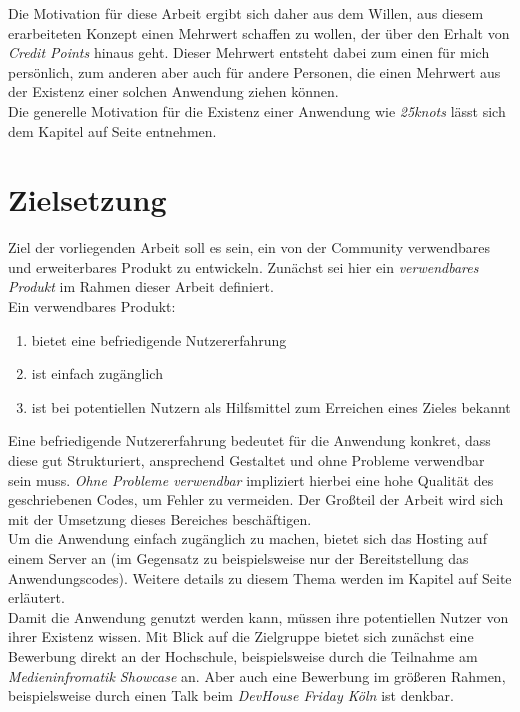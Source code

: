 Die Motivation für diese Arbeit ergibt sich daher aus dem Willen, aus diesem erarbeiteten Konzept einen Mehrwert schaffen zu wollen, der über den Erhalt von \textit{Credit Points} hinaus geht. Dieser Mehrwert entsteht dabei zum einen für mich persönlich, zum anderen aber auch für andere Personen, die einen Mehrwert aus der Existenz einer solchen Anwendung ziehen können.\\
Die generelle Motivation für die Existenz einer Anwendung wie \textit{25knots} lässt sich dem Kapitel \textit{} auf Seite \pageref{sec:relevance} entnehmen.

\section{Zielsetzung}
Ziel der vorliegenden Arbeit soll es sein, ein von der Community verwendbares und erweiterbares Produkt zu entwickeln. Zunächst sei hier ein \textit{verwendbares Produkt} im Rahmen dieser Arbeit definiert.\\
Ein verwendbares Produkt:

\begin{enumerate}
  \item bietet eine befriedigende Nutzererfahrung
  \item ist einfach zugänglich
  \item ist bei potentiellen Nutzern als Hilfsmittel zum Erreichen eines Zieles bekannt
\end{enumerate}

Eine befriedigende Nutzererfahrung bedeutet für die Anwendung konkret, dass diese gut Strukturiert, ansprechend Gestaltet und ohne Probleme verwendbar sein muss. \textit{Ohne Probleme verwendbar} impliziert hierbei eine hohe Qualität des geschriebenen Codes, um Fehler zu vermeiden. Der Großteil der Arbeit wird sich mit der Umsetzung dieses Bereiches beschäftigen.\\
Um die Anwendung einfach zugänglich zu machen, bietet sich das Hosting auf einem Server an (im Gegensatz zu beispielsweise nur der Bereitstellung das Anwendungscodes). Weitere details zu diesem Thema werden im Kapitel \textit{} auf Seite \pageref{chap:hosting} erläutert.\\
Damit die Anwendung genutzt werden kann, müssen ihre potentiellen Nutzer von ihrer Existenz wissen. Mit Blick auf die Zielgruppe bietet sich zunächst eine Bewerbung direkt an der Hochschule, beispielsweise durch die Teilnahme am \textit{Medieninfromatik Showcase} an. Aber auch eine Bewerbung im größeren Rahmen, beispielsweise durch einen Talk beim \textit{DevHouse Friday Köln} ist denkbar.\\

